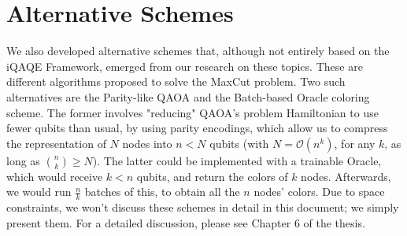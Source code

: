 \section{Alternative Schemes}
\label{sec:Alternative_Schemes}


We also developed alternative schemes that, although not entirely based on the iQAQE Framework, emerged from our research on these topics. These are different algorithms proposed to solve the MaxCut problem. Two such alternatives are the Parity-like QAOA and the Batch-based Oracle coloring scheme. The former involves "reducing" QAOA's problem Hamiltonian to use fewer qubits than usual, by using parity encodings, which allow us to compress the representation of \(N\) nodes into \(n < N\) qubits (with \(N = \mathcal{O}(n^k)\), for any \(k\), as long as \(\binom{n}{k} \geq N\)). The latter could be implemented with a trainable Oracle, which would receive $k < n$ qubits, and return the colors of $k$ nodes. Afterwards, we would run $\frac{n}{k}$ batches of this, to obtain all the $n$ nodes' colors. Due to space constraints, we won't discuss these schemes in detail in this document; we simply present them. For a detailed discussion, please see Chapter 6 of the thesis.